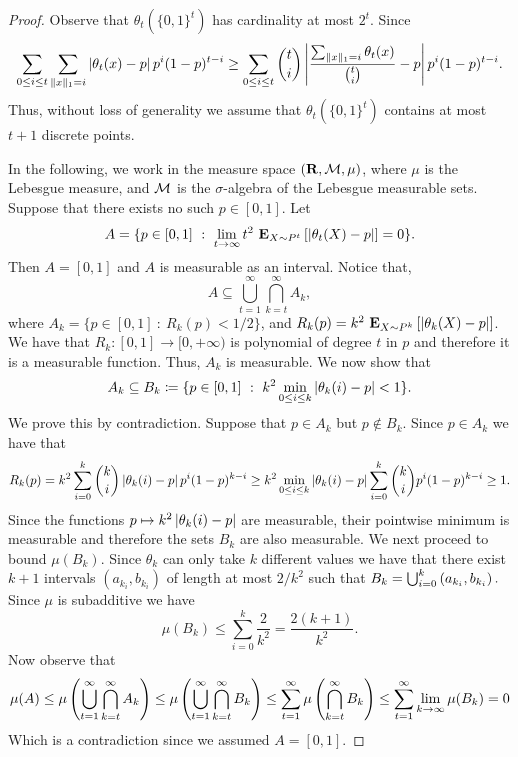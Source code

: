 \begin{proof}
  Observe that $\theta_t(\{0,1\}^t)$ has cardinality at most $2^t$.
  Since
  \[
    \sum_{0 \leq i \leq t} \sum_{\norm{1}{x} = i}
    \lp| \theta_t(x) - p \rp| p^i (1-p)^{t-i}
    \geq
    \sum_{0 \leq i \leq t} \binom{t}{i} \lp|
     \frac{\sum_{\norm{1}{x} = i} \theta_t(x)}{\binom{t}{i}}  - p \rp|
    p^i (1-p)^{t-i}.
  \]
  Thus, without loss of generality we assume that
  $\theta_t(\{0,1\}^t)$ contains at most $t+1$ discrete
  points.

  In the following, we work in the measure space
  $(\R, \mcal{M}, \mu)$, where $\mu$ is the Lebesgue measure,
  and $\mcal{M}$ is the $\sigma$-algebra of the Lebesgue measurable
  sets.
  Suppose that there exists no such $p \in [0,1]$.
  Let
  \[
    A =
    \{
    p \in [0,1]\ :\ \lim_{t\to \infty}
    t^2\ \Expnew{X \sim P^t}{\lp| \theta_t(X) - p \rp|} = 0
    \}.
  \]
  Then $A = [0,1]$ and $A$ is measurable as an interval.
  Notice that,
  \[
    A \subseteq \bigcup_{t=1}^{\infty} \bigcap_{k=t}^{\infty} A_k,
  \]
  where \( A_k = \{ p\in[0,1]\ :\ R_k(p) < 1/2 \} \),
  and \(R_k(p) = k^2\ \Expnew{X \sim P^k}{| \theta_k(X) - p|}\).
  We have that $R_k: [0,1] \to [0, +\infty) $ is polynomial of
  degree $t$ in $p$ and therefore it is a measurable function.
  Thus, $A_k$ is measurable.
  We now show that
  \[ A_k \subseteq B_k \coloneqq \{ p \in [0,1]\ : \
    k^2 \min_{0 \leq i \leq k} \lp| \theta_k(i) - p \rp| < 1 \}.
  \]
  We prove this by contradiction. Suppose that $p \in A_k$ but
  $p \notin B_k$. Since $p \in A_k$ we have that
  \begin{align*}
    R_k(p)
    =
    k^2 \sum_{i=0}^k \binom{k}{i} \lp| \theta_k(i) - p \rp| p^i (1-p)^{k-i}
    \geq
    k^2 \min_{0 \leq i \leq k} \lp| \theta_k(i) - p \rp|
    \sum_{i=0}^k \binom{k}{i} p^i (1-p)^{k-i}
    \geq 1.
  \end{align*}
  Since the functions $p \mapsto k^2 \lp| \theta_k(i) - p \rp|$ are
  measurable, their pointwise minimum is measurable and therefore
  the sets $B_k$ are also measurable.  We next proceed to bound
  $\mu(B_k)$. Since $\theta_k$ can only take $k$ different values
  we have that there exist $k+1$ intervals $(a_{k_i}, b_{k_i})$
  of length at most $2/k^2$ such that
  \(
    B_k = \bigcup_{i=0}^k \lp(a_{k_i}, b_{k_i} \rp).
  \)
  Since $\mu$ is subadditive we have
  \[
    \mu(B_k) \leq \sum_{i=0}^{k} \frac{2}{k^2} = \frac{2 (k+1)}{k^2}.  \]
  Now observe that
  \begin{align*}
    \mu(A)
    \leq \mu \lp( \bigcup_{t=1}^{\infty} \bigcap_{k=t}^{\infty} A_k \rp)
    \leq \mu \lp( \bigcup_{t=1}^{\infty} \bigcap_{k=t}^{\infty} B_k \rp)
    \leq \sum_{t = 1}^{\infty} \mu\lp(\bigcap_{k=t}^{\infty} B_k \rp)
    \leq \sum_{t = 1}^{\infty} \lim_{k \to \infty} \mu(B_k)
    = 0
  \end{align*}
  Which is a contradiction since we assumed $A = [0,1]$.
\end{proof}
